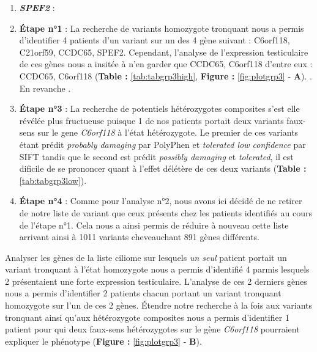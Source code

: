 \documentclass[12pt,twoside]{reedthesis}
\theoremstyle{definition}
\theoremstyle{definition}
\theoremstyle{remark}
\begin{document}
\begin{enumerate}
    (ancien nom de CCDC65) avait déjà caractérisé comme faisant partie du
    flagelle spermatique (Y. Zheng et al.,
    \protect\hyperlink{ref-Zheng2006}{2006})\\
  \item
    \textbf{\emph{SPEF2}} :
  \item
    \textbf{Étape n°1} : La recherche de variants homozygote tronquant
    nous a permis d'identifier 4 patients d'un variant sur un des 4 gène
    suivant : C6orf118, C21orf59, CCDC65, SPEF2. Cependant, l'analyse de
    l'expression testiculaire de ces gènes nous a insitée à n'en garder
    que CCDC65, C6orf118 d'entre eux : CCDC65, C6orf118 (\textbf{Table :}
    \ref{tab:tabgrp3high}, \textbf{Figure :} \ref{fig:plotgrp3} -
    \textbf{A}). . En revanche .
  \item
    \textbf{Étape n°3} : La recherche de potentiels hétérozygotes
    composites s'est elle révélée plus fructueuse puisque 1 de nos
    patients portait deux variants faux-sens sur le gene \emph{C6orf118} à
    l'état hétérozygote. Le premier de ces variants étant prédit
    \emph{probably damaging} par PolyPhen et \emph{tolerated low
    confidence} par SIFT tandis que le second est prédit \emph{possibly
    damaging} et \emph{tolerated}, il est dificile de se prononcer quant à
    l'effet délétère de ces deux variants (\textbf{Table :}
    \ref{tab:tabgrp3low}).
  \item
    \textbf{Étape n°4} : Comme pour l'analyse n°2, nous avons ici décidé
    de ne retirer de notre liste de variant que ceux présents chez les
    patients identifiés au cours de l'étape n°1. Cela nous a ainsi permis
    de réduire à nouveau cette liste arrivant ainsi à 1011 variants
    cheveauchant 891 gènes différents.
  \end{enumerate}
  
  Analyser les gènes de la liste ciliome sur lesquels \emph{un seul}
  patient portait un variant tronquant à l'état homozygote nous a permis
  d'identifié 4 parmis lesquels 2 présentaient une forte expression
  testiculaire. L'analyse de ces 2 derniers gènes nous a permis
  d'identifier 2 patients chacun portant un variant tronquant homozygote
  sur l'un de ces 2 gènes. Étendre notre recherche à la fois aux variants
  tronquant ainsi qu'aux hétérozygote composites nous a permis
  d'identifier 1 patient pour qui deux faux-sens hétérozygotes sur le gène
  \emph{C6orf118} pourraient expliquer le phénotype (\textbf{Figure :}
  \ref{fig:plotgrp3} - \textbf{B}).
  
  \newpage  
  
\end{document}
